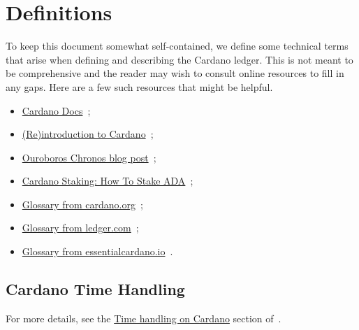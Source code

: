 \section{Definitions}
\label{sec:definitions}
To keep this document somewhat self-contained, we define some technical terms that
arise when defining and describing the Cardano ledger.
This is not meant to be comprehensive and the reader may wish to consult
online resources to fill in any gaps.  Here are a few such resources that might be
helpful.

\begin{itemize}
  \item
        \href{https://docs.cardano.org/}%
             {Cardano Docs}~\cite{www-docs-cardano};
  \item
        \href{https://developers.cardano.org/docs/operate-a-stake-pool/introduction-to-cardano/}%
             {(Re)introduction to Cardano}~\cite{www-developers-cardano-reintro};
  \item
        \href{https://iohk.io/en/blog/posts/2021/10/27/ouroboros-chronos-provides-the-first-high-resilience-cryptographic-time-source-based-on-blockchain/}%
             {Ouroboros Chronos blog post}~\cite{www-iohk-blog-ouroboros};
  \item
        \href{https://www.ledger.com/academy/cardano-staking-how-to-stake-ada}%
             {Cardano Staking: How To Stake ADA}~\cite{www-ledger-academy-stake-ada};
  \item
        \href{https://cardano.org/docs/glossary#cardano-glossary}%
             {Glossary from cardano.org}~\cite{www-cardano-glossary};
  \item
        \href{https://www.ledger.com/academy/glossary}%
             {Glossary from ledger.com}~\cite{www-ledger-academy-glossary};
  \item
        \href{https://www.essentialcardano.io/glossary?sort=alphabetical}%
             {Glossary from essentialcardano.io}~\cite{www-essential-cardano-glossary}.
\end{itemize}

\subsection{Cardano Time Handling}
\label{sec:cardano-time-handling}

For more details, see the
\href{https://docs.cardano.org/about-cardano/explore-more/time}%
     {Time handling on Cardano} section of~\cite{www-docs-cardano-time}.


